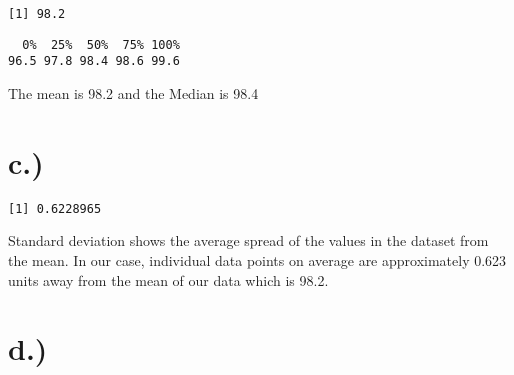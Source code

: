 \documentclass[
  letterpaper,
  DIV=11,
  numbers=noendperiod]{scrartcl}
\newenvironment{Shaded}{\begin{snugshade}}{\end{snugshade}}
\newcommand{\FunctionTok}[1]{\textcolor[rgb]{0.28,0.35,0.67}{#1}}
\newcommand{\NormalTok}[1]{\textcolor[rgb]{0.00,0.23,0.31}{#1}}
\newcommand{\SpecialCharTok}[1]{\textcolor[rgb]{0.37,0.37,0.37}{#1}}
\begin{document}
\begin{Shaded}
\end{Shaded}

\begin{verbatim}
[1] 98.2
\end{verbatim}

\begin{Shaded}
\end{Shaded}

\begin{verbatim}
  0%  25%  50%  75% 100% 
96.5 97.8 98.4 98.6 99.6 
\end{verbatim}

The mean is 98.2 and the Median is 98.4

\section{c.)}\label{c.}

\begin{Shaded}
\end{Shaded}

\begin{verbatim}
[1] 0.6228965
\end{verbatim}

Standard deviation shows the average spread of the values in the dataset
from the mean. In our case, individual data points on average are
approximately 0.623 units away from the mean of our data which is 98.2.

\section{d.)}\label{d.}

\begin{Shaded}
\end{Shaded}
\end{document}
